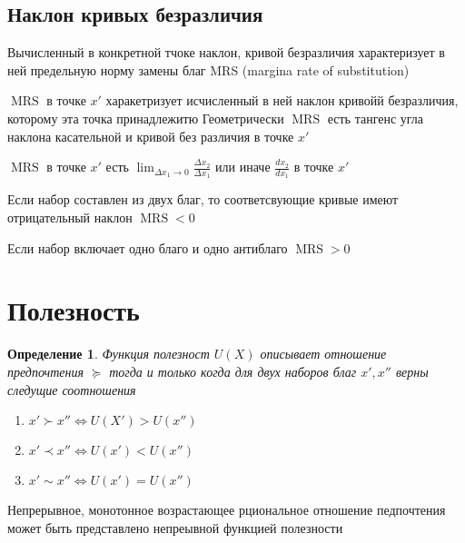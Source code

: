 \documentclass[14pt]{extarticle}
\newtheorem{definition}{Определение}
\DeclareMathOperator{\mrs}{MRS}
\begin{document}
	\subsection{Наклон кривых безразличия}
	Вычисленный в конкретной тчоке наклон,
	кривой безразличия характеризует в ней 
	предельную норму замены благ MRS (margina rate
	of substitution)

	$\mrs$ в точке  $x'$ 
	харакетризует исчисленный в ней наклон
	кривойй безразличия, которому эта точка принадлежитю
	Геометрически  $\mrs$ есть тангенс угла наклона касательной
	и кривой без различия в точке  $x'$

	$\mrs$ в точке  $x'$ есть  $\lim_{\Delta x_1 \to 0} \frac{\Delta x_2}{\Delta x_1}$ или иначе $\frac{d x_2}{d x_1}$ в точке $x'$


	Если набор составлен из двух благ, то соответсвующие кривые
	имеют отрицательный наклон  $\mrs < 0$

	Если набор включает одно благо и одно антиблаго $\mrs > 0$
	\section{Полезность}
	\begin{definition}
		Функция полезност $U(X)$ описывает отношение
		предпочтения  $\succeq$ тогда
		и только когда для двух наборов благ  $x', x''$ 
		верны следущие соотношения
		 \begin{enumerate}
			\item $x' \succ x'' \iff U(X') > U(x'')$
			\item  $x' \prec x'' \iff U(x') < U(x'')$
			\item  $x' \sim x'' \iff U(x') = U(x'')$ 
		\end{enumerate}
	\end{definition}
	Непрерывное, монотонное возрастающее рциональное
	отношение педпочтения может
	быть представлено непреывной функцией полезности
\end{document}
